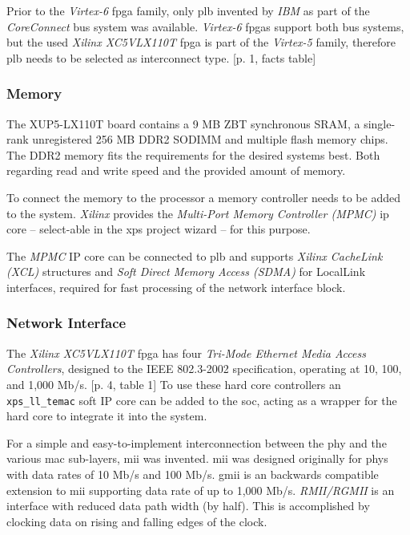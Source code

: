 Prior to the \textit{Virtex-6} \gls{fpga} family, only \gls{plb} invented by \textit{IBM} as part of the \textit{CoreConnect} bus system was available. \textit{Virtex-6} \gls{fpga}s support both bus systems, but the used \textit{Xilinx XC5VLX110T} \gls{fpga} is part of the \textit{Virtex-5} family, therefore \gls{plb} needs to be selected as interconnect type. \cite{axi_interconnect}[p. 1, facts table]

\subsubsection{Memory}

The XUP5-LX110T board contains a 9 MB ZBT synchronous SRAM, a single-rank unregistered 256 MB DDR2 SODIMM and multiple flash memory chips. The DDR2 memory fits the requirements for the desired systems best. Both regarding read and write speed and the provided amount of memory.

To connect the memory to the processor a memory controller needs to be added to the system.  \textit{Xilinx} provides the \textit{Multi-Port Memory Controller (MPMC)} \gls{ip} core -- select-able in the \gls{xps} project wizard -- for this purpose.

The \textit{MPMC} IP core can be connected to \gls{plb} and supports \textit{Xilinx CacheLink (XCL)} structures and \textit{Soft Direct Memory Access (SDMA)} for LocalLink interfaces, required for fast processing of the network interface block. \cite{mpmc}

\subsubsection{Network Interface}

The \textit{Xilinx XC5VLX110T} \gls{fpga} has four \textit{Tri-Mode Ethernet Media Access Controllers}, designed to the IEEE 802.3-2002 specification, operating at 10, 100, and 1,000 Mb/s. \cite{virtex5}[p. 4, table 1] To use these hard core controllers an \texttt{xps\_ll\_temac} soft IP core can be added to the \gls{soc}, acting as a wrapper for the hard core to integrate it into the system.

For a simple and easy-to-implement interconnection between the \gls{phy} and the various \gls{mac} sub-layers, \gls{mii} was invented. \gls{mii} was designed originally for \gls{phy}s with data rates of 10 Mb/s and 100 Mb/s. \gls{gmii} is an backwards compatible extension to \gls{mii} supporting data rate of up to 1,000 Mb/s. \textit{RMII/RGMII} is an interface with reduced data path width (by half). This is accomplished by clocking data on rising and falling edges of the clock.

